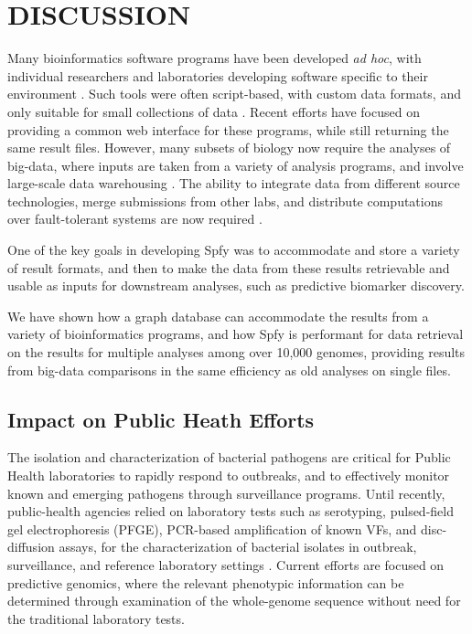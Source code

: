 \documentclass{article}
\begin{document}
\section{DISCUSSION}

Many bioinformatics software programs have been developed \textit{ad hoc}, with individual researchers and laboratories developing software specific to their environment \cite{de2015trends}.
Such tools were often script-based, with custom data formats, and only suitable for small collections of data \cite{de2015trends}.
Recent efforts \cite{goecks2010galaxy,thomsen2016bacterial} have focused on providing a common web interface for these programs, while still returning the same result files.
However, many subsets of biology now require the analyses of big-data, where inputs are taken from a variety of analysis programs, and involve large-scale data warehousing \cite{schatz2015biological}.
The ability to integrate data from different source technologies, merge submissions from other labs, and distribute computations over fault-tolerant systems are now required \cite{schatz2015biological}.

One of the key goals in developing Spfy was to accommodate and store a variety of result formats, and then to make the data from these results retrievable and usable as inputs for downstream analyses, such as predictive biomarker discovery.

We have shown how a graph database can accommodate the results from a variety of bioinformatics programs, and how Spfy is performant for data retrieval on the results for multiple analyses among over 10,000 genomes, providing results from big-data comparisons in the same efficiency as old analyses on single files.

\subsection{Impact on Public Heath Efforts}

The isolation and characterization of bacterial pathogens are critical for Public Health laboratories to rapidly respond to outbreaks, and to effectively monitor known and emerging pathogens through surveillance programs.
Until recently, public-health agencies relied on laboratory tests such as serotyping, pulsed-field gel electrophoresis (PFGE), PCR-based amplification of known VFs, and disc-diffusion assays, for the characterization of bacterial isolates in outbreak, surveillance, and reference laboratory settings \cite{ronholm2016navigating}. Current efforts are focused on predictive genomics, where the relevant phenotypic information can be determined through examination of the whole-genome sequence without need for the traditional laboratory tests.
\end{document}
